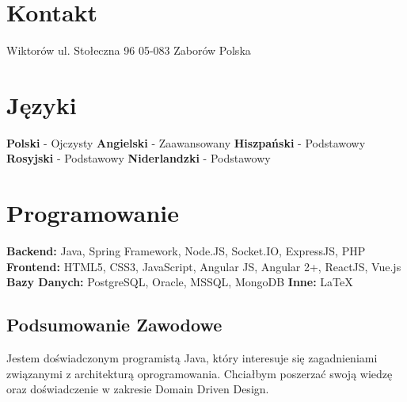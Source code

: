\documentclass[]{friggeri-cv} %
\begin{document}
	
	\begin{aside}
		\section{Kontakt}
		Wiktorów
		ul. Stołeczna 96
		05-083 Zaborów
		Polska
		~
		~
		
		\section{Języki}
		\textbf{Polski} - Ojczysty
		\textbf{Angielski} - Zaawansowany
		\textbf{Hiszpański} - Podstawowy
		\textbf{Rosyjski} - Podstawowy
		\textbf{Niderlandzki} - Podstawowy
		\section{Programowanie}
		\textbf{Backend:}
		Java, Spring Framework, Node.JS, Socket.IO, ExpressJS, PHP
		\textbf{Frontend:}
		HTML5, CSS3, JavaScript, Angular JS, Angular 2+, ReactJS, Vue.js
		\textbf{Bazy Danych:}
		PostgreSQL, Oracle, MSSQL, MongoDB
		\textbf{Inne:}
		\LaTeX
	\end{aside}
	
	\begin{absolutelynopagebreak}
		\section{Podsumowanie Zawodowe}
		Jestem doświadczonym programistą Java, który interesuje się zagadnieniami związanymi z architekturą oprogramowania. Chciałbym poszerzać swoją wiedzę oraz doświadczenie w zakresie Domain Driven Design.
	\end{absolutelynopagebreak}
	
\end{document}
